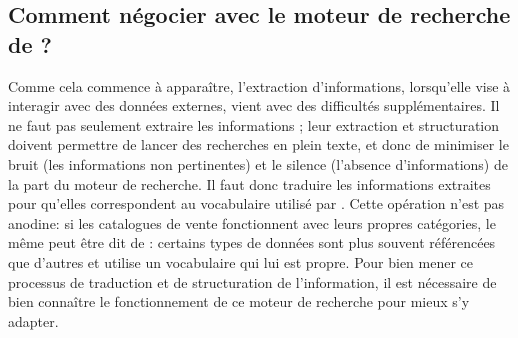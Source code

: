 \subsection{Comment négocier avec le moteur de recherche de \wkd{}?}
Comme cela commence à apparaître, l'extraction d'informations, lorsqu'elle vise à interagir avec des données externes, vient avec des difficultés supplémentaires. Il ne faut pas seulement extraire les informations ; leur extraction et structuration doivent permettre de lancer des recherches en plein texte, et donc de minimiser le bruit (les informations non pertinentes) et le silence (l'absence d'informations) de la part du moteur de recherche. Il faut donc traduire les informations extraites pour qu'elles correspondent au vocabulaire utilisé par \wkd{}. Cette opération n'est pas anodine: si les catalogues de vente fonctionnent avec leurs propres catégories, le même peut être dit de \wkd{}: certains types de données sont plus souvent référencées que d'autres et \wkd{} utilise un vocabulaire qui lui est propre. Pour bien mener ce processus de traduction et de structuration de l'information, il est nécessaire de bien connaître le fonctionnement de ce moteur de recherche pour mieux s'y adapter.

